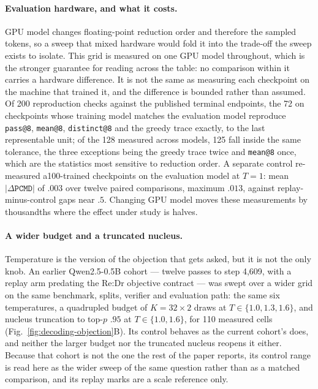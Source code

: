 \documentclass{article}
\makeatletter
\newcommand{\1}{\mathbf 1}
\newcommand{\pmd}{\texttt{PCMD}}
\newcommand{\distk}{\texttt{distinct@8}}
\theoremstyle{remark}
\theoremstyle{definition}
\theoremstyle{plain}
\makeatother
\begin{document}
\paragraph{Evaluation hardware, and what it costs.}
GPU model changes floating-point reduction order and therefore the sampled
tokens, so a sweep that mixed hardware would fold it into the trade-off the
sweep exists to isolate. This grid is measured on one GPU model throughout,
which is the stronger guarantee for reading across the table: no comparison
within it carries a hardware difference. It is not the same as measuring each
checkpoint on the machine that trained it, and the difference is bounded rather
than assumed. Of 200 reproduction checks against the published terminal
endpoints, the 72 on checkpoints whose training model matches the evaluation
model reproduce \texttt{pass@8}, \texttt{mean@8}, \distk{} and the greedy trace
exactly, to the last representable unit; of the 128 measured across models, 125
fall inside the same tolerance, the three exceptions being the greedy trace
twice and \texttt{mean@8} once, which are the statistics most sensitive to
reduction order. A separate control re-measured a100-trained checkpoints on the
evaluation model at $T=1$: mean $|\Delta\pmd{}|$ of $.003$ over twelve paired
comparisons, maximum $.013$, against replay-minus-control gaps near $.5$.
Changing GPU model moves these measurements by thousandths where the effect
under study is halves.

\paragraph{A wider budget and a truncated nucleus.}
Temperature is the version of the objection that gets asked, but it is not the
only knob. An earlier Qwen2.5-0.5B cohort --- twelve passes to step 4,609, with
a replay arm predating the Re:Dr objective contract --- was swept over a wider
grid on the same benchmark, splits, verifier and evaluation path: the same six
temperatures, a quadrupled budget of $K=32\times2$ draws at
$T\in\{1.0,1.3,1.6\}$, and nucleus truncation to top-$p$ $.95$ at
$T\in\{1.0,1.6\}$, for 110 measured cells
(Fig.~\ref{fig:decoding-objection}B). Its control behaves as the current
cohort's does, and neither the larger budget nor the truncated nucleus reopens
it either. Because that cohort is not the one the rest of the paper reports,
its control range is read here as the wider sweep of the same question rather
than as a matched comparison, and its replay marks are a scale reference only.
\end{document}
